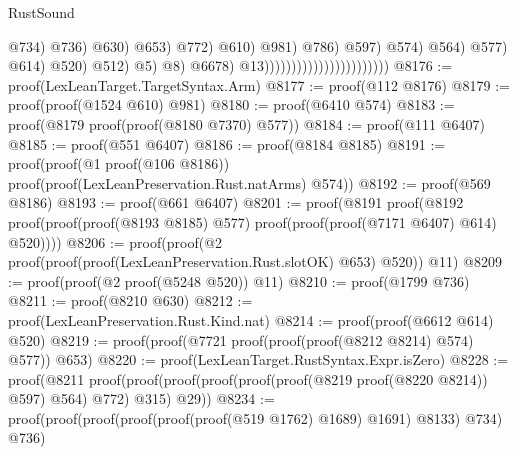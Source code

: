 \begin{lexlean}{RustSound}
\begin{coremodule}
                                                                                        @734)
                                                                                      @736)
                                                                                    @630)
                                                                                  @653)
                                                                                @772)
                                                                              @610)
                                                                            @981)
                                                                          @786)
                                                                        @597)
                                                                      @574)
                                                                    @564)
                                                                  @577)
                                                                @614)
                                                              @520)
                                                            @512)
                                                          @5)
                                                        @8)
                                                      @6678)
                                                    @13)))))))))))))))))))))))
@8176 := proof(LexLeanTarget.TargetSyntax.Arm)
@8177 := proof(@112 @8176)
@8179 := proof(proof(@1524 @610) @981)
@8180 := proof(@6410 @574)
@8183 := proof(@8179 proof(proof(@8180 @7370) @577))
@8184 := proof(@111 @6407)
@8185 := proof(@551 @6407)
@8186 := proof(@8184 @8185)
@8191 := proof(proof(@1 proof(@106 @8186)) proof(proof(LexLeanPreservation.Rust.natArms) @574))
@8192 := proof(@569 @8186)
@8193 := proof(@661 @6407)
@8201 := proof(@8191
      proof(@8192 proof(proof(proof(@8193 @8185) @577) proof(proof(proof(@7171 @6407) @614) @520))))
@8206 := proof(proof(@2 proof(proof(proof(LexLeanPreservation.Rust.slotOK) @653) @520)) @11)
@8209 := proof(proof(@2 proof(@5248 @520)) @11)
@8210 := proof(@1799 @736)
@8211 := proof(@8210 @630)
@8212 := proof(LexLeanPreservation.Rust.Kind.nat)
@8214 := proof(proof(@6612 @614) @520)
@8219 := proof(proof(@7721 proof(proof(proof(@8212 @8214) @574) @577)) @653)
@8220 := proof(LexLeanTarget.RustSyntax.Expr.isZero)
@8228 := proof(@8211
      proof(proof(proof(proof(proof(proof(@8219 proof(@8220 @8214)) @597) @564) @772) @315) @29))
@8234 := proof(proof(proof(proof(proof(proof(@519 @1762) @1689) @1691) @8133) @734) @736)

\end{coremodule}
\end{lexlean}
